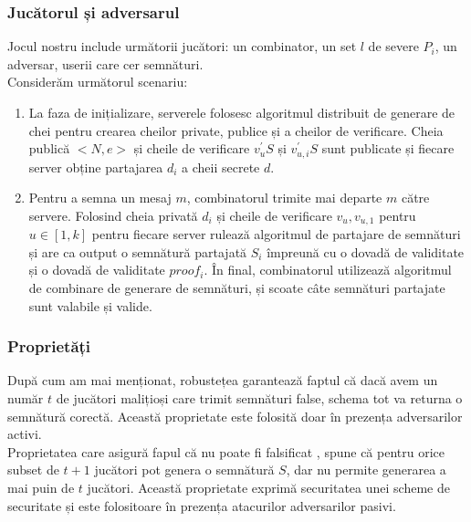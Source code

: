 \documentclass[12pt, oneside]{book}
\begin{document}
\subsubsection{Jucătorul și adversarul}
Jocul nostru include următorii jucători: un combinator, un set $l$ de severe $P_i$, un adversar, userii care cer semnături.\\
Considerăm următorul scenariu: \\
\begin{enumerate}
\item La faza de inițializare, serverele folosesc algoritmul distribuit de generare de chei pentru crearea cheilor private, publice și a cheilor de verificare. Cheia publică $<N,e>$ și cheile de verificare $v_{u}^{'}S$ și $v_{u,i}^{'}S$ sunt publicate și fiecare server obține partajarea $d_i$ a cheii secrete $d$.
\item Pentru a semna un mesaj $m$, combinatorul trimite mai departe $m$ către servere. Folosind cheia privată $d_i$ și cheile de verificare $v_u,v_{u,1}$ pentru $u \in [1,k]$ pentru fiecare server rulează algoritmul de partajare de semnături și are ca output o semnătură partajată $S_i$ împreună cu o dovadă de validitate și o dovadă de validitate $proof_i$. În final, combinatorul utilizează algoritmul de combinare de generare de semnături, și scoate câte semnături partajate sunt valabile și valide.
\end{enumerate}
\subsubsection{Proprietăți}
După cum am mai menționat, robustețea garantează faptul că dacă avem un număr $t$ de jucători malițioși care trimit semnături false, schema tot va returna o semnătură corectă. Această proprietate este folosită doar în prezența adversarilor activi.\\
Proprietatea care asigură fapul că nu poate fi falsificat , spune că pentru orice subset de $t+1$ jucători pot genera o semnătură $S$, dar nu permite generarea a mai puin de $t$ jucători. Această proprietate exprimă securitatea unei scheme de securitate și este folositoare în prezența atacurilor adversarilor pasivi.
\end{document}

